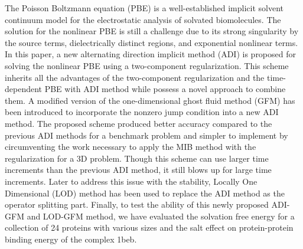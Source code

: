 The Poisson Boltzmann equation (PBE) is a well-established implicit solvent continuum model for the electrostatic analysis of solvated biomolecules. The solution for the nonlinear PBE is still a challenge due to its strong singularity by the source terms, dielectrically distinct regions, and exponential nonlinear terms. In this paper, a new alternating direction implicit method (ADI) is proposed for solving the nonlinear PBE using a two-component regularization. This scheme inherits all the advantages of the two-component regularization and the time-dependent PBE with ADI method while possess a novel approach to combine them. A modified version of the one-dimensional ghost fluid method (GFM) has been introduced to incorporate the nonzero jump condition into a new ADI method. The proposed scheme produced better accuracy compared to the previous ADI methods for a benchmark problem and simpler to implement by circumventing the work necessary to apply the MIB method with the regularization for a 3D problem. Though this scheme can use larger time increments than the previous ADI method, it still blows up for large time increments. Later to address this issue with the stability, Locally One Dimensional (LOD) method has been used to replace the ADI method as the operator splitting part. Finally, to test the ability of this newly proposed ADI-GFM and LOD-GFM method, we have evaluated the solvation free energy for a collection of 24 proteins with various sizes and the salt effect on protein-protein binding energy of the complex 1beb.